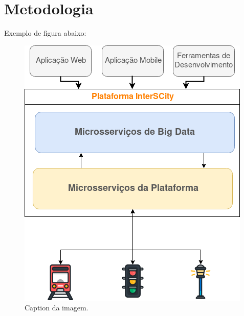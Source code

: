 \section{Metodologia}
\label{sec:metodologia}

\begin{large}

  Exemplo de figura abaixo:

  \begin{figure}[ht]
  \centering
  \includegraphics[scale=0.4]{images/interscity_platfor.png}
  \caption{Caption da imagem.}
  \label{fig:bigdataLayer}
  \end{figure}

\end{large}
